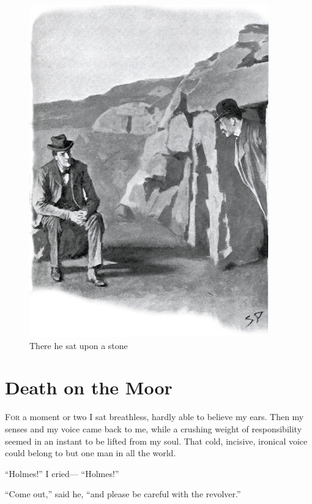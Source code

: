\documentclass[paper=5.5in:8.5in,BCOR=7mm,twoside,DIV=calc,12pt,usegeometry,openany,chapterprefix,endperiod,headings=big]{scrbook} %
\begin{document}
\clearpage
\vfill
\begin{figure}[tbph]
\centering
\includegraphics[width=\linewidth]{12_therehesat}
\caption{There he sat upon a stone}
\end{figure}
\vfill
\thispagestyle{empty}
\clearpage

\chapter{Death on the Moor}
\lettrine[lines=1]{F}{or} a moment or two I sat breathless, hardly able to believe my ears. Then my senses and my voice came back to me, while a crushing weight of responsibility seemed in an instant to be lifted from my soul. That cold, incisive, ironical voice could belong to but one man in all the world.

\enquote{Holmes!} I cried--- \enquote{Holmes!}

\enquote{Come out,} said he, \enquote{and please be careful with the revolver.}
\end{document}
